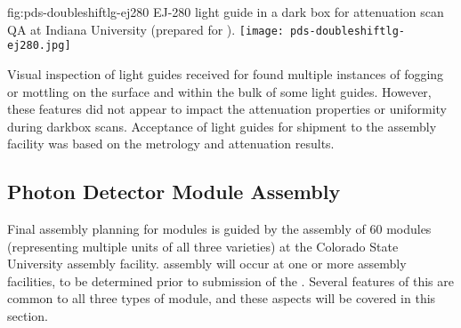\begin{dunefigure}{fig:pds-doubleshiftlg-ej280}
{EJ-280 light guide in a dark box for attenuation scan QA at Indiana University (prepared for ).}
  \texttt{[image: pds-doubleshiftlg-ej280.jpg]}
\end{dunefigure}

Visual inspection of light guides received for  found multiple instances of fogging or mottling on the surface and within the bulk of some light guides. However, these features did not appear to impact the attenuation properties or uniformity during darkbox scans. Acceptance of light guides for shipment to the assembly facility was based on the metrology and attenuation results.






\subsection{Photon Detector Module Assembly}

Final assembly planning for  modules is guided by the assembly of \num{60}   modules (representing multiple units of all three varieties) at the Colorado State University assembly facility.   assembly will occur at one or more assembly facilities, to be determined prior to submission of the .  Several features of this are common to all three types of module, and these aspects will be covered in this section.

